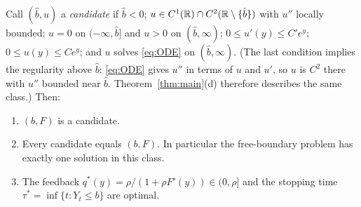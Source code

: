 \begin{atheorem}\label{thm:verif}
Call $(\hat b,u)$ a \emph{candidate} if $\hat b<0$; $u\in C^1(\mathbb{R})\cap C^2(\mathbb{R}\setminus\{\hat b\})$ with $u''$ locally bounded; $u=0$ on $(-\infty,\hat b]$ and $u>0$ on $(\hat b,\infty)$; $0\le u'(y)\le C'e^y$; $0\le u(y)\le Ce^y$; and $u$ solves \eqref{eq:ODE} on $(\hat b,\infty)$. (The last condition implies the regularity above $\hat b$: \eqref{eq:ODE} gives $u''$ in terms of $u$ and $u'$, so $u$ is $C^2$ there with $u''$ bounded near $\hat b$. Theorem~\ref{thm:main}(d) therefore describes the same class.) Then:
\begin{enumerate}
\item $(b,F)$ is a candidate.
\item Every candidate equals $(b,F)$. In particular the free-boundary problem has exactly one solution in this class.
\item The feedback $q^*(y)=\rho/(1+\rho F'(y))\in(0,\rho]$ and the stopping time $\tau^*=\inf\{t:Y_t\le b\}$ are optimal.
\end{enumerate}
\end{atheorem}

